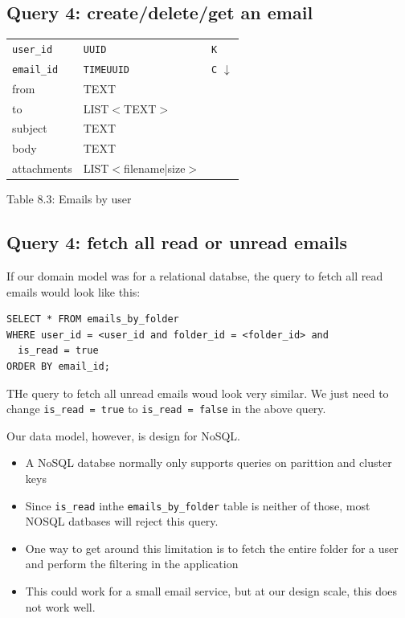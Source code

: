 \documentclass{report}
\theoremstyle{definition}
\let\oldsubsection\subsection
\renewcommand{\subsection}{\oldsubsection*}
\begin{document}
\subsection{Query 4: create/delete/get an email}

\begin{tabular}{|p{4cm}|p{4cm}|p{4cm}|}
\hline
\lstinline|user_id| & \lstinline|UUID| & \lstinline|K| \\
\lstinline|email_id| & \lstinline|TIMEUUID| & \lstinline|C| $\downarrow$ \\
from & TEXT & \\
to & LIST$<$TEXT$>$ &  \\
subject & TEXT &  \\
body & TEXT &  \\
attachments & LIST$<$filename|size$>$ &  \\
\hline
\end{tabular}

Table 8.3: Emails by user

\subsection{Query 4: fetch all read or unread emails}

If our domain model was for a relational databse, the query to fetch all read emails would look like this:

\begin{lstlisting}
SELECT * FROM emails_by_folder
WHERE user_id = <user_id and folder_id = <folder_id> and
  is_read = true
ORDER BY email_id;
\end{lstlisting}

THe query to fetch all unread emails woud look very similar. We just need to change \lstinline|is_read = true| to \lstinline|is_read = false| in the above query.

Our data model, however, is design for NoSQL.

\begin{itemize}
\item
A NoSQL databse normally only supports queries on parittion and cluster keys
\item
Since \lstinline|is_read| inthe \lstinline|emails_by_folder| table is neither of those, most NOSQL datbases will reject this query.
\item
One way to get around this limitation is to fetch the entire folder for a user and perform the filtering in the application
\item
This could work for a small email service, but at our design scale, this does not work well.
\end{itemize}
\end{document}
